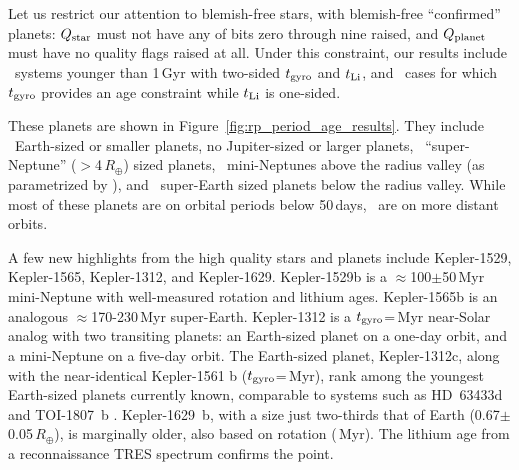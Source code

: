 \documentclass[11pt,twocolumn,tighten]{aastex63}
\begin{document}
Let us restrict our attention to blemish-free stars, with blemish-free
``confirmed'' planets: $Q_{\rm star}$ must not have any of bits zero
through nine raised, and $Q_{\rm planet}$ must have no quality flags
raised at all.  Under this constraint, our results include
\ltonegyrhighqconfirmedtwosided\ systems younger than 1\,Gyr with
two-sided $t_{\rm gyro}$ and $t_{\rm Li}$, and
\ltonegyrhighqconfirmedonesided\ cases for which $t_{\rm gyro}$
provides an age constraint while $t_{\rm Li}$ is one-sided.

These planets are shown in Figure~\ref{fig:rp_period_age_results}.
They include \nearthshighqconfirmed\ Earth-sized or smaller planets,
no Jupiter-sized or larger planets, \nsubsaturnshighqconfirmed\
``super-Neptune'' ($>$4\,$R_\oplus$) sized planets,
\nminineptuneshighqconfirmed\ mini-Neptunes above the radius valley
(as parametrized by \citealt{2018MNRAS.479.4786V}), and
\nsuperearthshighqconfirmed\ super-Earth sized planets below the
radius valley.  While most of these planets are on orbital periods
below 50\,days, \nlongperiodhighqconfirmed\ are on more distant
orbits.

A few new highlights from the high quality stars and planets include
Kepler-1529, Kepler-1565, Kepler-1312, and Kepler-1629.  Kepler-1529b
is a $\approx$100$\pm$50\,Myr mini-Neptune with well-measured rotation
and lithium ages.  Kepler-1565b is an analogous $\approx$170-230\,Myr
super-Earth.  Kepler-1312 is a $t_{\rm gyro}$=\kepthirteentwelve\,Myr
near-Solar analog with two transiting planets: an Earth-sized planet
on a one-day orbit, and a mini-Neptune on a five-day orbit.  The
Earth-sized planet, Kepler-1312c, along with the near-identical
Kepler-1561 b ($t_{\rm gyro}$=\kepfifteensixone\,Myr), rank among the
youngest Earth-sized planets currently known, comparable to systems
such as HD~63433d \citep[1.1\,$R_\oplus$,
$414$$\pm$$23$\,Myr;][]{2024AJ....167...54C} and TOI-1807~b
\citep[1.3\,$R_\oplus$, 180$\pm$40\,Myr;][]{2021AJ....162...54H}.
Kepler-1629~b, with a size just two-thirds that of Earth
(0.67$\pm$0.05\,$R_\oplus$), is marginally older, also based on
rotation (\kepsixteentwonine\,Myr).  The lithium age from a
reconnaissance TRES spectrum confirms the point.
\end{document}

